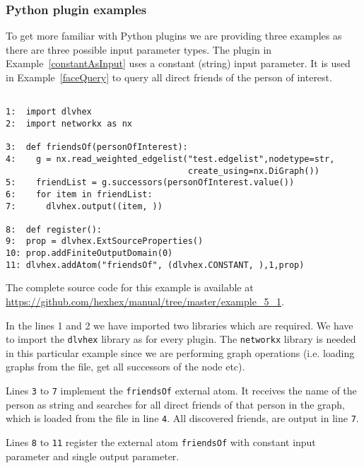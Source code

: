 \documentclass[a4paper, titlepage]{article}
\newcommand{\examplelink}[1]{\url{https://github.com/hexhex/manual/tree/master/#1}}
\begin{document}
\subsubsection{Python plugin examples}
To get more familiar with Python plugins we are providing three examples as there are three possible input parameter types. The plugin in Example~\ref{constantAsInput} uses a constant (string) input parameter. It is used in Example~\ref{faceQuery} to query all direct friends of the person of interest.
\begin{exmp}
\label{constantAsInput}
\begin{verbatim}

1:  import dlvhex
2:  import networkx as nx

3:  def friendsOf(personOfInterest):
4:    g = nx.read_weighted_edgelist("test.edgelist",nodetype=str,
                                    create_using=nx.DiGraph())
5:    friendList = g.successors(personOfInterest.value())
6:    for item in friendList:
7:      dlvhex.output((item, ))

8:  def register():
9:  prop = dlvhex.ExtSourceProperties()
10: prop.addFiniteOutputDomain(0)
11: dlvhex.addAtom("friendsOf", (dlvhex.CONSTANT, ),1,prop)
\end{verbatim}
\end{exmp}
The complete source code for this example is available at \examplelink{example_5_1}.


In the lines 1 and 2 we have imported two libraries which 
are required. We have to import the \verb+dlvhex+ 
library as for every plugin. The \verb+networkx+ library is needed in this particular example since we are 
performing graph operations (i.e. loading graphs from the file, get all successors of the node etc). 

Lines \verb+3+ to \verb+7+ implement the \verb+friendsOf+ external atom. 
It receives the name of the person as string and searches for all 
direct friends of that person in the graph, which is loaded from the file in line \verb+4+. All discovered friends, are output in line \verb+7+. 

Lines \verb+8+ to \verb+11+ register the external atom 
\verb+friendsOf+ with constant input parameter and 
single output parameter. 
\end{document}
